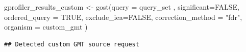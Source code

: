 \documentclass[
]{book}
\newenvironment{Shaded}{\begin{snugshade}}{\end{snugshade}}
\newcommand{\AttributeTok}[1]{\textcolor[rgb]{0.77,0.63,0.00}{#1}}
\newcommand{\CommentTok}[1]{\textcolor[rgb]{0.56,0.35,0.01}{\textit{#1}}}
\newcommand{\ConstantTok}[1]{\textcolor[rgb]{0.00,0.00,0.00}{#1}}
\newcommand{\DecValTok}[1]{\textcolor[rgb]{0.00,0.00,0.81}{#1}}
\newcommand{\FunctionTok}[1]{\textcolor[rgb]{0.00,0.00,0.00}{#1}}
\newcommand{\NormalTok}[1]{#1}
\newcommand{\OtherTok}[1]{\textcolor[rgb]{0.56,0.35,0.01}{#1}}
\newcommand{\SpecialCharTok}[1]{\textcolor[rgb]{0.00,0.00,0.00}{#1}}
\newcommand{\StringTok}[1]{\textcolor[rgb]{0.31,0.60,0.02}{#1}}
\begin{document}
\begin{Shaded}
\begin{Highlighting}[]
\NormalTok{gprofiler\_results\_custom }\OtherTok{\textless{}{-}} \FunctionTok{gost}\NormalTok{(}\AttributeTok{query =}\NormalTok{ query\_set ,}
                                     \AttributeTok{significant=}\ConstantTok{FALSE}\NormalTok{,}
                                 \AttributeTok{ordered\_query =} \ConstantTok{TRUE}\NormalTok{,}
                                    \AttributeTok{exclude\_iea=}\ConstantTok{FALSE}\NormalTok{,}
                                     \AttributeTok{correction\_method =} \StringTok{"fdr"}\NormalTok{,}
                                 \AttributeTok{organism =}\NormalTok{ custom\_gmt}
\NormalTok{                                     )}
\end{Highlighting}
\end{Shaded}

\begin{verbatim}
## Detected custom GMT source request
\end{verbatim}

\begin{Shaded}
\end{Shaded}
\end{document}
